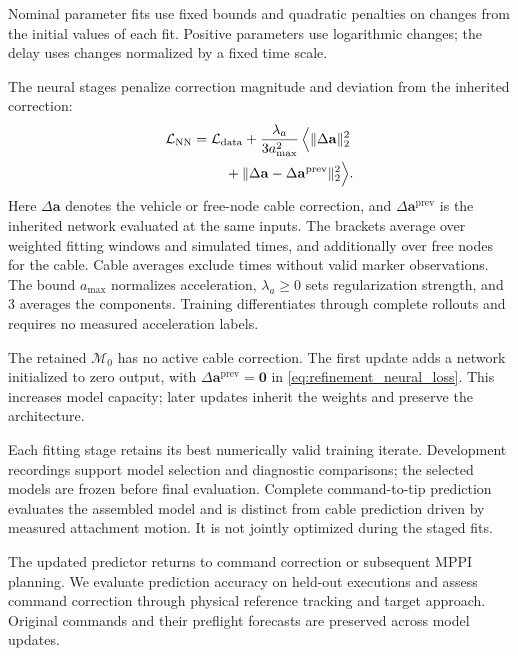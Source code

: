 Nominal parameter fits use fixed bounds and quadratic penalties
on changes from the initial values of each fit. Positive parameters
use logarithmic changes; the delay uses changes normalized by a
fixed time scale.

The neural stages penalize correction magnitude and deviation
from the inherited correction:
\begin{equation}
\begin{aligned}
\mathcal L_{\mathrm{NN}}
={}&\mathcal L_{\mathrm{data}}+\frac{\lambda_a}{3a_{\max}^2}\,
\Bigl\langle\|\Delta\mathbf a\|_2^2\\
&\quad+\|\Delta\mathbf a-\Delta\mathbf a^{\mathrm{prev}}\|_2^2\Bigr\rangle.
\end{aligned}
\label{eq:refinement_neural_loss}
\end{equation}
Here $\Delta\mathbf a$ denotes the vehicle or free-node cable
correction, and $\Delta\mathbf a^{\mathrm{prev}}$ is the
inherited network evaluated at the same inputs.
The brackets average over weighted fitting windows and simulated
times, and additionally over free nodes for the cable. Cable
averages exclude times without valid marker observations.
The bound $a_{\max}$ normalizes acceleration, $\lambda_a\geq0$
sets regularization strength, and $3$ averages the components.
Training differentiates through complete rollouts and requires
no measured acceleration labels.

The retained $\mathcal M_0$ has no active cable correction.
The first update adds a network initialized to zero output, with
$\Delta\mathbf a^{\mathrm{prev}}=\mathbf0$ in
\eqref{eq:refinement_neural_loss}. This increases model capacity;
later updates inherit the weights and preserve the architecture.

Each fitting stage retains its best numerically valid training
iterate. Development recordings support model selection and
diagnostic comparisons; the selected models are frozen before
final evaluation. Complete command-to-tip prediction evaluates
the assembled model and is distinct from cable prediction driven
by measured attachment motion. It is not jointly optimized during
the staged fits.

The updated predictor returns to command correction or subsequent
MPPI planning. We evaluate prediction accuracy on held-out
executions and assess command correction through physical
reference tracking and target approach. Original commands and
their preflight forecasts are preserved across model updates.

